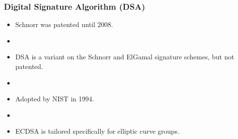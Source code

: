 \documentclass[hyperref={pdfpagelabels=true},table,dvipsnames,14pt,aspectratio=169]{beamer}
\begin{document}
\begin{frame}
  \centering
\scalebox{0.9} {
}
\end{frame}


\begin{frame}
\frametitle{Digital Signature Algorithm (DSA)}

  \begin{itemize}
    \item<1-> Schnorr was patented until 2008.  
    \item[]
    \item<2-> DSA is a variant on the Schnorr and ElGamal signature schemes, but not patented. 
    \item[]
    \item<3-> Adopted by NIST in 1994. 
    \item[]
    \item<4-> ECDSA is tailored specifically for elliptic curve groups. 
  \end{itemize}
\end{frame}
\end{document}
